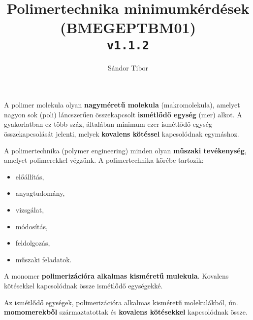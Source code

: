 \documentclass[12pt,a4paper]{article}       %
\title{Polimertechnika minimumkérdések \\ \large(BMEGEPTBM01) \\ \texttt{v1.1.2}}
\author{Sándor Tibor}
\begin{document}

\maketitle
\thispagestyle{fancy}

\begin{tcbitemize}[
    enhanced, raster columns=1, raster row skip=1em, raster equal height=rows,
    colback=red!20!yellow!5!white, colframe=yellow!25!black, breakable,
    enhanced jigsaw
  ]

  \tcbitem[title={\# \thetcbrasternum –
        Mi a polimer?
      }]
  A polimer molekula olyan \textbf{nagyméretű molekula} (makromolekula),
  amelyet nagyon sok (poli) láncszerűen összekapcsolt \textbf{ismétlődő egység}
  (mer) alkot. A gyakorlatban ez több száz, általában minimum ezer ismétlődő
  egység összekapcsolását jelenti, melyek \textbf{kovalens kötéssel}
  kapcsolódnak egymáshoz.



  \tcbitem[title={\# \thetcbrasternum –
        Mi a polimertechnika?
      }]
  A polimertechnika (polymer engineering) minden olyan \textbf{műszaki
    tevékenység}, amelyet polimerekkel végzünk. A polimertechnika körébe
  tartozik:
  \begin{multicols}{3}
    \begin{itemize}
      \item előállítás,
      \item anyagtudomány,
      \item vizsgálat,
      \item módosítás,
      \item feldolgozás,
      \item műszaki feladatok.
    \end{itemize}
  \end{multicols}



  \tcbitem[title={\# \thetcbrasternum{} –
        Mi a monomer?
      }]
  A monomer \textbf{polimerizációra alkalmas kisméretű mulekula}. Kovalens
  kötésekkel kapcsolódnak össze ismétlődő egységekké.



  \tcbitem[title={\# \thetcbrasternum{} –
        Mit jelent az ismétlődő egység?
      }]
  Az ismétlődő egységek, polimerizációra alkalmas kisméretű molekulákból, ún.
  \textbf{momomerekből} származtatottak és \textbf{kovalens kötésekkel}
  kapcsolódnak össze.




\end{tcbitemize}
\end{document}
